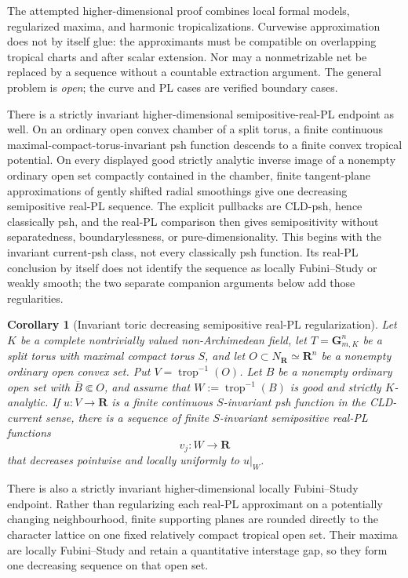 \documentclass[11pt,a4paper]{article}
\newtheorem{corollary}[corollary]{Corollary}
\theoremstyle{definition}
\theoremstyle{remark}
\begin{document}
The attempted higher-dimensional proof combines local formal models,
regularized maxima, and harmonic tropicalizations.  Curvewise approximation
does not by itself glue: the approximants must be compatible on overlapping
tropical charts and after scalar extension.  Nor may a nonmetrizable net be
replaced by a sequence without a countable extraction argument.  The general
problem is \emph{open}; the curve and PL cases are verified boundary cases.

There is a strictly invariant higher-dimensional semipositive-real-PL
endpoint as well.  On an ordinary open convex chamber of a split torus, a
finite continuous maximal-compact-torus-invariant psh function descends to a
finite convex tropical potential.  On every displayed good strictly analytic
inverse image of a nonempty ordinary open set compactly contained in the
chamber, finite tangent-plane approximations of gently shifted
radial smoothings give one decreasing semipositive real-PL sequence.  The
explicit pullbacks are CLD-psh, hence classically psh, and the real-PL
comparison then gives semipositivity without separatedness, boundarylessness,
or pure-dimensionality.  This begins with the invariant current-psh class,
not every classically psh function.  Its real-PL conclusion by itself does
not identify the sequence as locally Fubini--Study or weakly smooth; the two
separate companion arguments below add those regularities.


\begin{corollary}[Invariant toric decreasing semipositive real-PL regularization]
\label{cor:p021-invariant-toric-semipositive-rpl-regularization}
Let \(K\) be a complete nontrivially valued non-Archimedean field, let
\(T=\mathbf G_{m,K}^n\) be a split torus with maximal compact torus \(S\),
and let \(O\subset N_{\mathbf R}\simeq\mathbf R^n\) be a nonempty ordinary
open convex set.  Put \(V=\operatorname{trop}^{-1}(O)\).  Let \(B\) be a
nonempty ordinary open set with \(\overline B\Subset O\), and assume that
\(W:=\operatorname{trop}^{-1}(B)\) is good and strictly \(K\)-analytic.
If \(u:V\to\mathbf R\) is a finite
continuous \(S\)-invariant psh function in the CLD-current sense, there is a
sequence of finite
\(S\)-invariant semipositive real-PL functions
\[
                    v_j:W\longrightarrow\mathbf R
\]
that decreases pointwise and locally uniformly to \(u|_W\).
\end{corollary}




There is also a strictly invariant higher-dimensional locally
Fubini--Study endpoint.  Rather than regularizing each real-PL approximant
on a potentially changing neighbourhood, finite supporting planes are
rounded directly to the character lattice on one fixed relatively compact
tropical open set.
Their maxima are locally Fubini--Study and retain a quantitative
interstage gap, so they form one decreasing sequence on that open set.
\end{document}
